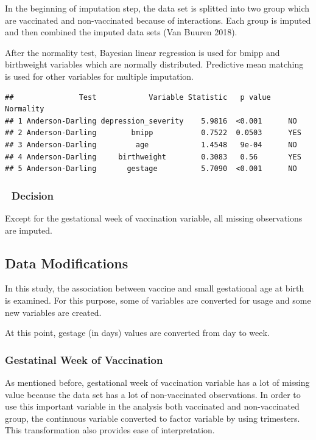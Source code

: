\documentclass[
]{article}
\begin{document}
In the beginning of imputation step, the data set is splitted into two
group which are vaccinated and non-vaccinated because of interactions.
Each group is imputed and then combined the imputed data sets (Van
Buuren 2018).

After the normality test, Bayesian linear regression is used for bmipp
and birthweight variables which are normally distributed. Predictive
mean matching is used for other variables for multiple imputation.

\begin{verbatim}
##               Test            Variable Statistic   p value Normality
## 1 Anderson-Darling depression_severity    5.9816  <0.001      NO    
## 2 Anderson-Darling        bmipp           0.7522  0.0503      YES   
## 3 Anderson-Darling         age            1.4548   9e-04      NO    
## 4 Anderson-Darling     birthweight        0.3083   0.56       YES   
## 5 Anderson-Darling       gestage          5.7090  <0.001      NO
\end{verbatim}

\hypertarget{decision-1}{%
\subsubsection{🎯 Decision}\label{decision-1}}

Except for the gestational week of vaccination variable, all missing
observations are imputed.

\hypertarget{data-modifications}{%
\subsection{Data Modifications}\label{data-modifications}}

In this study, the association between vaccine and small gestational age
at birth is examined. For this purpose, some of variables are converted
for usage and some new variables are created.

At this point, gestage (in days) values are converted from day to week.

\hypertarget{gestatinal-week-of-vaccination}{%
\subsubsection{Gestatinal Week of
Vaccination}\label{gestatinal-week-of-vaccination}}

As mentioned before, gestational week of vaccination variable has a lot
of missing value because the data set has a lot of non-vaccinated
observations. In order to use this important variable in the analysis
both vaccinated and non-vaccinated group, the continuous variable
converted to factor variable by using trimesters. This transformation
also provides ease of interpretation.
\end{document}
